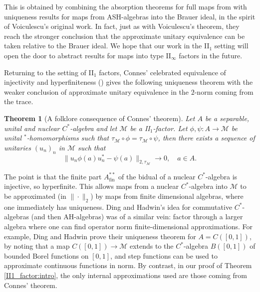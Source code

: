 \documentclass[reqno]{amsart}
\newtheorem*{theorem*}{Theorem}
\theoremstyle{definition}
\theoremstyle{remark}
\numberwithin{equation}{section}
\theoremstyle{definition}
\newcommand{\calM}{\mathcal{M}}
\begin{document}
This is obtained by combining the absorption theorems for full maps from \cite{Li_Shen_Shi} with uniqueness results  for maps from ASH-algebras into the Brauer ideal, in the spirit of Voiculescu's original work. In fact, just as with Voiculescu's theorem, they reach the stronger conclusion that the approximate unitary equivalence can be taken relative to the Brauer ideal.  We hope that our work in the II$_1$ setting will open the door to abstract results for maps into type II$_\infty$ factors in the future.

Returning to the setting of II$_1$ factors, Connes' celebrated equivalence of injectivity and hyperfiniteness (\cite{Connes:Annals}) gives the following uniqueness theorem with the weaker conclusion of approximate unitary equivalence in the $2$-norm coming from the trace.  

\begin{theorem*}[A folklore consequence of Connes' theorem]\label{Connes} 
Let $A$ be a separable, unital and nuclear $C^*$-algebra and let $\calM$ be a II$_{1}$-factor. Let $\phi, \psi: A\rightarrow \calM$ be unital $^*$-homomorphisms such that $\tau_{\calM} \circ \phi = \tau_{\calM} \circ \psi$, then there exists a sequence of unitaries $(u_{n})_n$ in $\calM$ such that 
\begin{equation} \label{Intro.Connes}
\|u_n \phi(a)u_n^*-\psi(a)\|_{2,\tau_{\calM}}\to 0, \quad a\in A. 
\end{equation} 
\end{theorem*}
The point is that the finite part $A^{**}_{\text{fin}}$ of the bidual of a nuclear $C^*$-algebra is injective, so hyperfinite.  This allows maps from a nuclear $C^*$-algebra into $\mathcal M$ to be approximated (in $\|\cdot\|_2$) by maps from finite dimensional algebras, where one immediately has uniqueness. Ding and Hadwin's idea for commutative $C^*$-algebras (and then AH-algebras) was of a similar vein: factor through a larger algebra where one can find operator norm finite-dimensional approximations. For example, Ding and Hadwin prove their uniqueness theorem for $A=C([0,1])$, by noting that a map  $C([0,1])\to\mathcal M$ extends to the $C^*$-algebra $B([0,1])$ of bounded Borel functions on $[0,1]$, and step functions can be used to approximate continuous functions in norm. By contrast, in our proof of Theorem \ref{II1_factor:intro}, the only internal approximations used are those coming from Connes' theorem.
 
\end{document}
